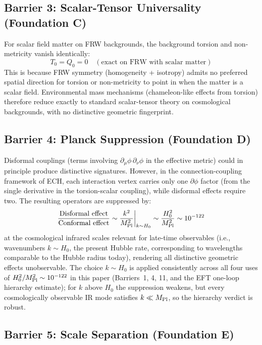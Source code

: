 \documentclass[aps,prd,twocolumn,superscriptaddress,showpacs,preprintnumbers,nofootinbib,longbibliography,floatfix]{revtex4-2}
\newcommand{\MPl}{M_{\rm Pl}}
\begin{document}
\subsection{Barrier 3: Scalar-Tensor Universality (Foundation C)}

For scalar field matter on FRW backgrounds, the background torsion and non-metricity vanish identically:
\begin{equation}
T_0 = Q_0 = 0 \quad (\text{exact on FRW with scalar matter})
\end{equation}
This is because FRW symmetry (homogeneity + isotropy) admits no preferred spatial direction for torsion or non-metricity to point in when the matter is a scalar field. Environmental mass mechanisms (chameleon-like effects from torsion) therefore reduce exactly to standard scalar-tensor theory on cosmological backgrounds, with no distinctive geometric fingerprint.

\subsection{Barrier 4: Planck Suppression (Foundation D)}

Disformal couplings (terms involving $\partial_\mu\phi\,\partial_\nu\phi$ in the effective metric) could in principle produce distinctive signatures. However, in the connection-coupling framework of ECH, each interaction vertex carries only one $\partial\phi$ factor (from the single derivative in the torsion-scalar coupling), while disformal effects require two. The resulting operators are suppressed by:
\begin{equation}
\frac{\text{Disformal effect}}{\text{Conformal effect}} \sim \frac{k^2}{\MPl^2}\bigg|_{k \sim H_0} \sim \frac{H_0^2}{\MPl^2} \sim 10^{-122}
\end{equation}
at the cosmological infrared scales relevant for late-time observables (i.e., wavenumbers $k \sim H_0$, the present Hubble rate, corresponding to wavelengths comparable to the Hubble radius today), rendering all distinctive geometric effects unobservable. The choice $k \sim H_0$ is applied consistently across all four uses of $H_0^2/\MPl^2 \sim 10^{-122}$ in this paper (Barriers~1, 4, 11, and the EFT one-loop hierarchy estimate); for $k$ above $H_0$ the suppression weakens, but every cosmologically observable IR mode satisfies $k \ll \MPl$, so the hierarchy verdict is robust.

\subsection{Barrier 5: Scale Separation (Foundation E)}
\end{document}
